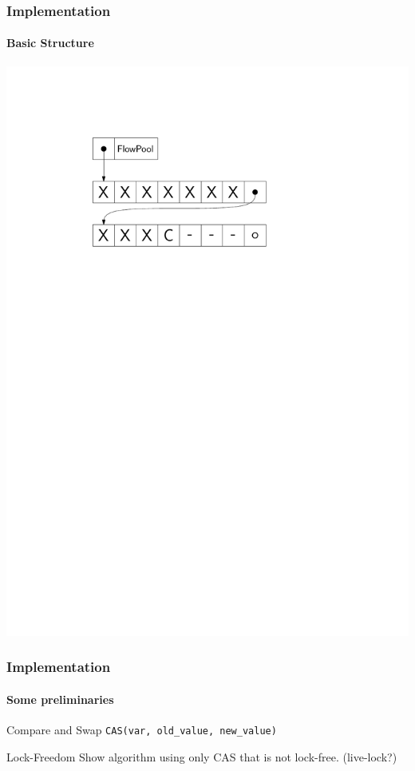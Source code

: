 \documentclass{beamer}
\begin{document}
\begin{frame}
  \frametitle{Implementation}
  \framesubtitle{Basic Structure}

  \begin{center}
    \includegraphics{figs/SLFP}
  \end{center}

\end{frame}

\begin{frame}
  \frametitle{Implementation}
  \framesubtitle{Some preliminaries}

  \begin{block}{Compare and Swap}
    \texttt{CAS(var, old\_value, new\_value)}
  \end{block}

  \begin{block}{Lock-Freedom}
    Show algorithm using only CAS that is not lock-free. (live-lock?)
  \end{block}

\end{frame}
\end{document}
